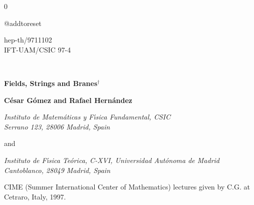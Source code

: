 




\textwidth 160mm
\textheight 210mm
\oddsidemargin 0mm
\evensidemargin 0mm

\thispagestyle{empty}
\setcounter{page}0



\baselineskip 6mm

\newcommand{\MqV}{$\cal M$$_{q}$($\cal V$)}
\def\II{\relax{\rm 1\kern-.35em1}}
\def\IP{\relax{\rm I\kern-.18em P}}
\renewcommand{\theequation}{\thesection.\arabic{equation}}
\csname @addtoreset



\begin{flushright}
hep-th/9711102 \\
IFT-UAM/CSIC 97-4
\end{flushright}
\vglue 1cm

\begin{center}

{}~\vfill

{\large \bf  Fields, Strings and Branes}$^{\dag}$

\vspace{20 mm}


{\bf C\'{e}sar G\'{o}mez and Rafael Hern\'{a}ndez}

\vspace{1cm}

{\em Instituto de Matem\'{a}ticas y F\'{\i}sica Fundamental, CSIC \protect \\
Serrano 123, 28006 Madrid, Spain}
\vspace{1cm}

and
  
\vspace{1cm}
  

{\em Instituto de F\'{\i}sica Te\'{o}rica, C-XVI, Universidad Aut\'{o}noma de
Madrid \protect \\ Cantoblanco, 28049 Madrid, Spain}

\end{center}

\vspace{6 cm}

\dag  \hspace{2 mm}CIME (Summer International Center of 
Mathematics) lectures given by C.G. at Cetraro, Italy, 1997.

\pagebreak


